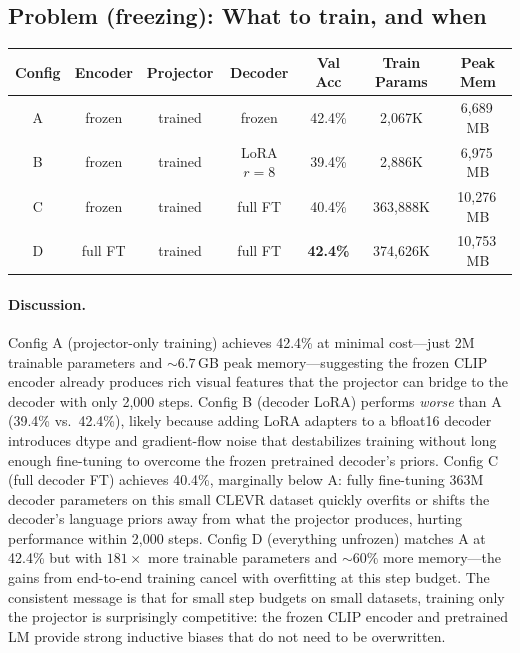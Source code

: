 \documentclass[11pt]{article}
\begin{document}
\subsection*{Problem (freezing): What to train, and when}

\begin{center}
\begin{tabular}{ccccccc}
\toprule
Config & Encoder & Projector & Decoder & Val Acc & Train Params & Peak Mem \\
\midrule
A & frozen  & trained & frozen       & 42.4\% & 2{,}067K   & 6{,}689\,MB \\
B & frozen  & trained & LoRA $r{=}8$ & 39.4\% & 2{,}886K   & 6{,}975\,MB \\
C & frozen  & trained & full FT      & 40.4\% & 363{,}888K & 10{,}276\,MB \\
D & full FT & trained & full FT      & \textbf{42.4\%} & 374{,}626K & 10{,}753\,MB \\
\bottomrule
\end{tabular}
\end{center}

\paragraph{Discussion.}
Config A (projector-only training) achieves 42.4\% at minimal cost---just 2M trainable parameters and ${\sim}6.7$\,GB peak memory---suggesting the frozen CLIP encoder already produces rich visual features that the projector can bridge to the decoder with only 2{,}000 steps.
Config B (decoder LoRA) performs \emph{worse} than A (39.4\% vs.\ 42.4\%), likely because adding LoRA adapters to a bfloat16 decoder introduces dtype and gradient-flow noise that destabilizes training without long enough fine-tuning to overcome the frozen pretrained decoder's priors.
Config C (full decoder FT) achieves 40.4\%, marginally below A: fully fine-tuning 363M decoder parameters on this small CLEVR dataset quickly overfits or shifts the decoder's language priors away from what the projector produces, hurting performance within 2{,}000 steps.
Config D (everything unfrozen) matches A at 42.4\% but with $181\times$ more trainable parameters and ${\sim}60\%$ more memory---the gains from end-to-end training cancel with overfitting at this step budget.
The consistent message is that for small step budgets on small datasets, training only the projector is surprisingly competitive: the frozen CLIP encoder and pretrained LM provide strong inductive biases that do not need to be overwritten.
\end{document}
